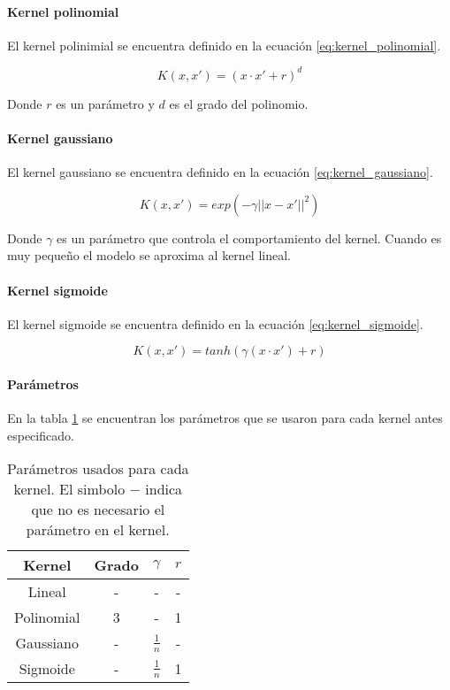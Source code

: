 \paragraph{Kernel polinomial}

El kernel polinimial se encuentra definido en la ecuación \ref{eq:kernel_polinomial}.

\begin{equation}
    K(x,x') = (x \cdot x'+r)^d
    \label{eq:kernel_polinomial}
\end{equation}

Donde $r$ es un parámetro y $d$ es el grado del polinomio.

\paragraph{Kernel gaussiano}

El kernel gaussiano se encuentra definido en la ecuación \ref{eq:kernel_gaussiano}.

\begin{equation}
    K(x,x') = exp(- \gamma ||x - x'||^2)
    \label{eq:kernel_gaussiano}
\end{equation}

Donde $\gamma$ es un parámetro que controla el comportamiento del kernel. Cuando es muy pequeño el modelo se aproxima al kernel lineal.

\paragraph{Kernel sigmoide}

El kernel sigmoide se encuentra definido en la ecuación \ref{eq:kernel_sigmoide}.

\begin{equation}
    K(x,x') = tanh(\gamma (x \cdot x') +r)
    \label{eq:kernel_sigmoide}
\end{equation}


\paragraph{Parámetros}

En la tabla \ref{table:pca_parameters} se encuentran los parámetros que se usaron para cada kernel antes especificado.

\begin{table}[H]
    \centering
    \begin{tabular}{cccc} \hline
        Kernel     & Grado & $\gamma$      & $r$ \\ \hline
        Lineal     & -     & -             & -   \\
        Polinomial & 3     & -             & 1   \\
        Gaussiano  & -     & $\frac{1}{n}$ & -   \\
        Sigmoide   & -     & $\frac{1}{n}$ & 1   \\ \hline
    \end{tabular}
    \caption{Parámetros usados para cada kernel. El simbolo $-$ indica que no es necesario el parámetro en el kernel.}
    \label{table:pca_parameters}
\end{table}